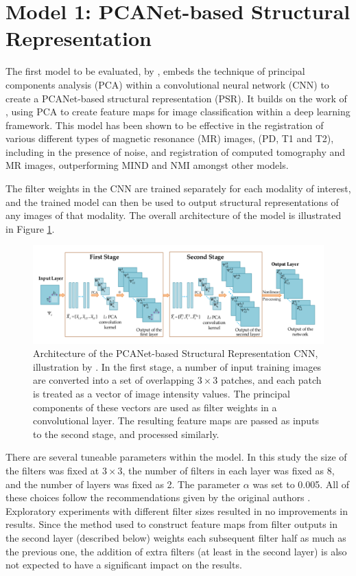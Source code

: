 \documentclass{report}
\begin{document}
\section{Model 1: PCANet-based Structural Representation}
\label{sec:model1}
The first model to be evaluated, by \cite{zhu2018pcanet}, embeds the technique of principal components analysis (PCA) within a convolutional neural network (CNN) to create a PCANet-based structural representation (PSR). It builds on the work of \cite{chan2015pcanet}, using PCA to create feature maps for image classification within a deep learning framework. This model has been shown to be effective in the registration of various different types of magnetic resonance (MR) images, (PD, T1 and T2), including in the presence of noise, and registration of computed tomography and MR images, outperforming MIND and NMI amongst other models.

The filter weights in the CNN are trained separately for each modality of interest, and the trained model can then be used to output structural representations of any images of that modality. The overall architecture of the model is illustrated in Figure \ref{fig:PSR}.

\begin{figure}
\centering
\includegraphics[width=5.5in]{PSR_architecture.pdf}
\caption{Architecture of the PCANet-based Structural Representation CNN, illustration by \cite{zhu2018pcanet}. In the first stage, a number of input training images are converted into a set of overlapping $3\times 3$ patches, and each patch is treated as a vector of image intensity values. The principal components of these vectors are used as filter weights in a convolutional layer. The resulting feature maps are passed as inputs to the second stage, and processed similarly.}
\label{fig:PSR}
\end{figure}

There are several tuneable parameters within the model. In this study the size of the filters was fixed at $3 \times 3$, the number of filters in each layer was fixed as 8, and the number of layers was fixed as 2. The parameter $\alpha$ was set to 0.005. All of these choices follow the recommendations given by the original authors \citep{zhu2018pcanet}. Exploratory experiments with different filter sizes resulted in no improvements in results. Since the method used to construct feature maps from filter outputs in the second layer (described below) weights each subsequent filter half as much as the previous one, the addition of extra filters (at least in the second layer) is also not expected to have a significant impact on the results.
\end{document}

